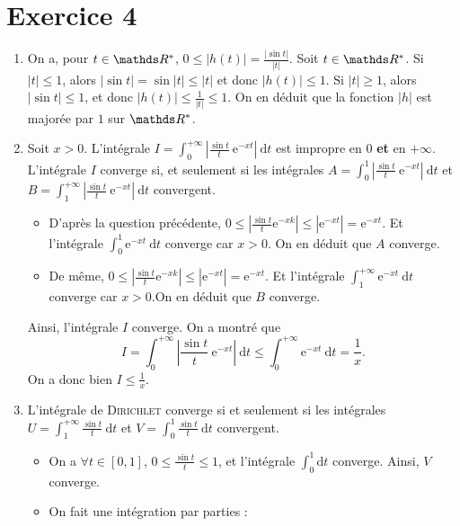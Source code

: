 \section{Exercice 4}

\begin{enumerate}
	\item On a, pour $t \in \R^*$, $0 \le |h(t)| = \frac{|{\sin t|}}{|t|}$. Soit $t \in \R^*$. Si $|t| \le 1$, alors $|{\sin t}| = \sin {|t|} \le |t|$\/ et donc $|h(t)| \le 1$. Si $|t| \ge 1$, alors $|{\sin t}| \le 1$, et donc $|h(t)| \le \frac{1}{|t|} \le 1$. On en déduit que la fonction $|h|$\/ est majorée par $1$\/ sur $\R^*$.
	\item Soit $x > 0$. L'intégrale $I = \int_{0}^{+\infty} \left| \frac{\sin t}{t}\:\mathrm{e}^{-xt} \right| ~\mathrm{d}t$\/ est impropre en 0 \textbf{et} en $+\infty$. L'intégrale $I$\/ converge si, et seulement si les intégrales $A = \int_{0}^{1} \left| \frac{\sin t}{t}\: \mathrm{e}^{-xt} \right| ~\mathrm{d}t$\/ et $B = \int_{1}^{+\infty}  \left| \frac{\sin t}{t}\: \mathrm{e}^{-xt} \right| ~\mathrm{d}t$\/ convergent.
		\begin{itemize}
			\item D'après la question précédente, $0 \le \left| \frac{\sin t}{t} \mathrm{e}^{-xk} \right| \le \left| \mathrm{e}^{-xt} \right| = \mathrm{e}^{-xt}$. Et l'intégrale $\int_{0}^{1} \mathrm{e}^{-xt}~\mathrm{d}t$\/ converge car $x > 0$. On en déduit que $A$\/ converge.
			\item De même, $0 \le \left| \frac{\sin t}{t} \mathrm{e}^{-xk} \right| \le \left| \mathrm{e}^{-xt} \right| = \mathrm{e}^{-xt}$. Et l'intégrale $\int_{1}^{+\infty} \mathrm{e}^{-xt}~\mathrm{d}t$\/ converge car $x > 0$.On en déduit que $B$\/ converge.
		\end{itemize}
		Ainsi, l'intégrale $I$\/ converge.
		On a montré que \[
			I = \int_{0}^{+\infty} \left| \frac{\sin t}{t} \: \mathrm{e}^{-xt} \right|~\mathrm{d}t \le \int_{0}^{+\infty} \mathrm{e}^{-xt}~\mathrm{d}t = \frac{1}{x}
		.\] On a donc bien $I \le \frac{1}{x}$.
	\item L'intégrale de \textsc{Dirichlet} converge si et seulement si les intégrales $U = \int_{1}^{+\infty} \frac{\sin t}{t} ~\mathrm{d}t$\/ et $V = \int_{0}^{1} \frac{\sin t}{t}~\mathrm{d}t$\/ convergent.
		\begin{itemize}
			\item On a $\forall t \in [0,1]$, $0\le \frac{\sin t}{t} \le 1$, et l'intégrale $\int_{0}^{1}\mathrm{d}t$\/ converge. Ainsi, $V$\/ converge.
			\item On fait une intégration par parties :

\end{itemize}
\end{enumerate}
